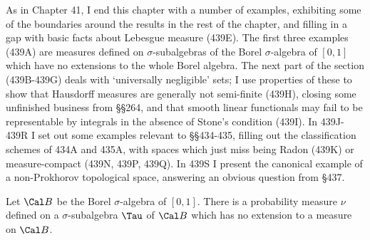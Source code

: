 
\def\chaptername{Topologies and measures II}
\def\sectionname{Examples}
\def\NN{\BbbN^{\Bbb N}}


As in Chapter 41, I end this chapter with a number of examples,
exhibiting some of the boundaries around the results in the rest of the
chapter, and filling in a gap with basic facts about Lebesgue measure
(439E).   The first three examples (439A) are measures defined on
$\sigma$-subalgebras of the Borel $\sigma$-algebra of $[0,1]$ which have
no extensions to the whole Borel algebra.   The next part of the section
(439B-439G) deals with `universally negligible' sets;  I use properties
of these to show that Hausdorff measures are generally not semi-finite
(439H), closing some unfinished business from \S\S264, and that
smooth linear functionals may fail to be representable by integrals in
the absence of Stone's condition (439I).   In 439J-439R I set out some
examples relevant to \S\S434-435, filling out the classification schemes
of 434A and 435A, with spaces which just miss being Radon (439K) or
measure-compact (439N, 439P, 439Q).   In 439S I present the canonical
example of a non-Prokhorov topological space, answering an obvious
question from \S437.

 Let $\Cal B$ be the Borel $\sigma$-algebra of
$[0,1]$.
There is a probability measure $\nu$ defined on a $\sigma$-subalgebra
$\Tau$ of $\Cal B$ which has no extension to a measure on $\Cal B$.


